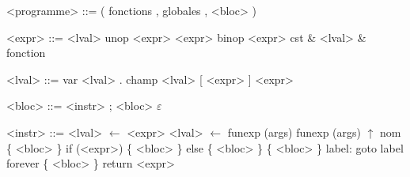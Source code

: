 \begin{grammarf}
<programme> ::= ( fonctions , globales , <bloc> )
\end{grammarf}
\begin{minipage}{0.4\textwidth}
\begin{grammarf}
    <expr> ::= <lval>
          \alt unop <expr>
          \alt <expr> binop <expr>
          \alt cst
          \alt \& <lval>
          \alt \& fonction

    <lval> ::= var
          \alt <lval> . champ
          \alt <lval> [ <expr> ]
          \alt * <expr>
\end{grammarf}
\end{minipage}
\begin{minipage}{0.4\textwidth}
\begin{grammarf}
     <bloc> ::= <instr> ; <bloc>
           \alt $ε$

    <instr> ::= <lval> $←$ <expr>
           \alt <lval> $←$ funexp (args)
           \alt funexp (args)
           \alt $↑$ nom \{ <bloc> \}
           \alt if (<expr>) \{ <bloc> \} else \{ <bloc> \}
           \alt \{ <bloc> \} label:
           \alt goto label
           \alt forever \{ <bloc> \}
           \alt return <expr>
\end{grammarf}
\end{minipage}
